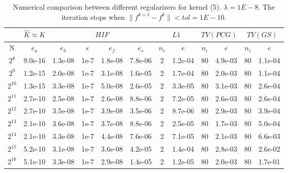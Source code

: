 \documentclass[11pt]{article}
\begin{document}
\begin{table}[!htbp]
\centering
\begin{tabular}{|c|c|c|c|c|c|c|c|c|c|c|c|}
\hline
\multicolumn{1}{c|}{} & \multicolumn{1}{c|}{$\hat{K} \approx K$} & \multicolumn{4}{c|}{$HIF$} & \multicolumn{2}{c|}{$L1$} &\multicolumn{2}{c|}{$TV(PCG)$} & \multicolumn{2}{c|}{$TV(GS)$} \\
\hline
N & $e_{a}$ & $e_{h}$ & $\epsilon$ & $e_{f}$ & $e_{s}$ & $n_{i}$ & $e$  & $n_{i}$ & $e$ &  $n_{i}$ & $e$ \\ 
\hline
$2^{8}$ & 9.0e-16 & 1.3e-08 & 1e-7 & 1.8e-08 & 7.8e-06 & 2 & 1.2e-04 & 80 & 4.9e-03 & 80 & 1.1e-04\\
\hline
$2^{9}$ & 1.2e-15 & 2.0e-08 & 1e-7 & 3.1e-08 & 1.6e-05 & 2 & 1.7e-04 & 80 & 2.0e-03 & 80 & 1.1e-04\\
\hline
$2^{10}$ & 1.3e-15 & 3.3e-08 & 1e-7 & 5.0e-08 & 2.6e-05 & 2 & 3.3e-05 & 80 & 3.1e-03 & 80 & 2.6e-04\\
\hline
$2^{11}$ & 2.7e-10 & 2.5e-08 & 1e-7 & 2.6e-08 & 8.8e-06 & 2 & 7.2e-05 & 80 & 2.6e-03 & 80 & 2.6e-04\\
\hline
$2^{12}$ & 2.7e-10 & 3.5e-08 & 1e-7 & 3.9e-08 & 3.5e-06 & 2 & 8.7e-06 & 80 & 2.9e-03 & 80 & 3.9e-04\\
\hline
$2^{13}$ & 2.1e-10 & 3.6e-08 & 1e-7 & 3.7e-08 & 8.8e-06 & 2 & 2.5e-05 & 80 & 1.7e-03 & 80 & 5.0e-04\\
\hline
$2^{14}$ & 2.1e-10 & 3.3e-08 & 1e-7 & 4.4e-08 & 7.6e-06 & 2 & 7.1e-05 & 80 & 2.1e-03 & 80 & 6.6e-03\\
\hline
$2^{15}$ & 5.2e-10 & 3.1e-08 & 1e-7 & 3.6e-08 & 4.2e-05 & 2 & 1.4e-04 & 80 & 2.8e-03 & 80 & 2.6e-02\\
\hline
$2^{16}$ & 5.1e-10 & 3.3e-08 & 1e-7 & 2.9e-08 & 1.4e-05 & 2 & 1.2e-05 & 80 & 2.0e-03 & 80 & 1.7e-01\\



\end{tabular}

\caption{Numerical comparison between different regularizers for kernel (5). $\lambda = 1E-8$. The iteration stops when $\|f^{k+1}-f^{k}\| < tol=1E-10$.}
\label{1d-k5}
\end{table}









 

\end{document}
